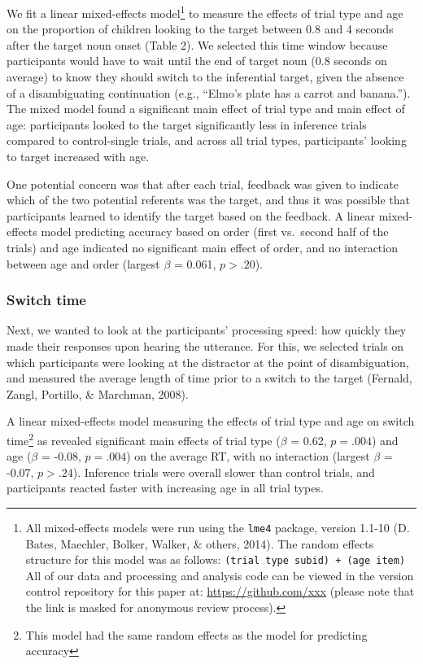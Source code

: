 \documentclass[a4paper,man,apacite,floatsintext]{apa6}
\begin{document}
We fit a linear mixed-effects model\footnote{All mixed-effects models
  were run using the \texttt{lme4} package, version 1.1-10 (D. Bates,
  Maechler, Bolker, Walker, \& others, 2014). The random effects
  structure for this model was as follows:
  \texttt{(trial type \textbar{} subid) + (age \textbar{} item)} All of
  our data and processing and analysis code can be viewed in the version
  control repository for this paper at:
  \url{https://github.com/xxx} (please note that the link is masked for anonymous review process).} to measure the effects of
trial type and age on the proportion of children looking to the target
between 0.8 and 4 seconds after the target noun onset (Table 2). We
selected this time window because participants would have to wait until
the end of target noun (0.8 seconds on average) to know they should
switch to the inferential target, given the absence of a disambiguating
continuation (e.g., ``Elmo's plate has a carrot and banana.''). The
mixed model found a significant main effect of trial type and main
effect of age: participants looked to the target significantly less in
inference trials compared to control-single trials, and across all trial
types, participants' looking to target increased with age.

One potential concern was that after each trial, feedback was given to
indicate which of the two potential referents was the target, and thus
it was possible that participants learned to identify the target based
on the feedback. A linear mixed-effects model predicting accuracy based
on order (first vs.~second half of the trials) and age indicated no
significant main effect of order, and no interaction between age and
order (largest \(\beta\) = 0.061, \(p >.20\)).

\subsubsection{Switch time}\label{switch-time}

Next, we wanted to look at the participants' processing speed: how
quickly they made their responses upon hearing the utterance. For this,
we selected trials on which participants were looking at the distractor
at the point of disambiguation, and measured the average length of time
prior to a switch to the target (Fernald, Zangl, Portillo, \& Marchman,
2008).

A linear mixed-effects model measuring the effects of trial type and age
on switch time\footnote{This model had the same random effects as the
  model for predicting accuracy} as revealed significant main effects of
trial type (\(\beta\) = 0.62, \(p =.004\)) and age (\(\beta\) = -0.08,
\(p =.004\)) on the average RT, with no interaction (largest \(\beta\) =
-0.07, \(p >.24\)). Inference trials were overall slower than control
trials, and participants reacted faster with increasing age in all trial
types.
\end{document}
